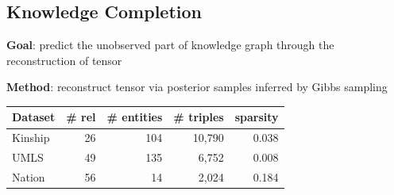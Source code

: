 \documentclass[a0,landscape]{a0poster}
\begin{document}
\begin{multicols}{3}
\section{Knowledge Completion}
\noindent\textbf{Goal}: predict the unobserved part of knowledge graph through the reconstruction of tensor

\noindent\textbf{Method}: reconstruct tensor via posterior samples inferred by Gibbs sampling


\vspace{.5cm}

\begin{center}
\begin{tabular}{l | r | r | r | r}
Dataset &  \# rel & \# entities & \# triples & sparsity \\ \hline
Kinship & 26 & 104  & 10,790 & 0.038 \\
UMLS & 49 &135  & 6,752 & 0.008 \\
Nation & 56 & 14  & 2,024 & 0.184 \\
\end{tabular}
\end{center}

\vspace{1cm}


\vspace{.5cm}


\end{multicols}
\end{document}
